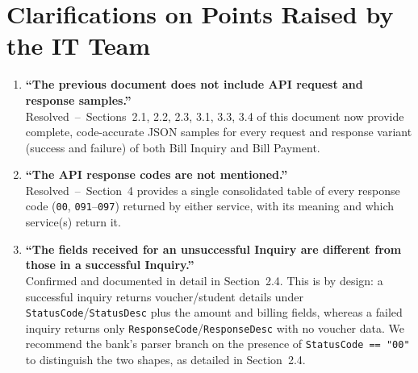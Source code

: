 \documentclass[11pt]{article}
\begin{document}
\section{Clarifications on Points Raised by the IT Team}
\begin{enumerate}
    \item \textbf{``The previous document does not include API request and response samples.''} \\
    Resolved \,--\, Sections~2.1, 2.2, 2.3, 3.1, 3.3, 3.4 of this document now provide complete,
    code-accurate JSON samples for every request and response variant (success and failure)
    of both Bill Inquiry and Bill Payment.

    \item \textbf{``The API response codes are not mentioned.''} \\
    Resolved \,--\, Section~4 provides a single consolidated table of every response code
    (\texttt{00}, \texttt{091}--\texttt{097}) returned by either service, with its meaning and
    which service(s) return it.

    \item \textbf{``The fields received for an unsuccessful Inquiry are different from those in
    a successful Inquiry.''} \\
    Confirmed and documented in detail in Section~2.4. This is by design: a successful
    inquiry returns voucher/student details under \texttt{StatusCode}/\texttt{StatusDesc} plus
    the amount and billing fields, whereas a failed inquiry returns only
    \texttt{ResponseCode}/\texttt{ResponseDesc} with no voucher data. We recommend the bank's
    parser branch on the presence of \texttt{StatusCode == "00"} to distinguish the two shapes,
    as detailed in Section~2.4.
\end{enumerate}
\end{document}

